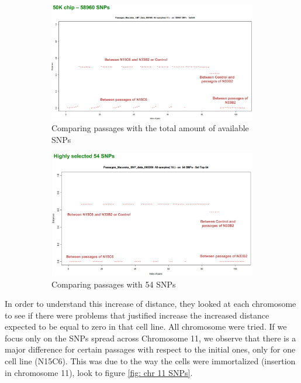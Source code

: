 \begin{figure}[ht]
	\centering
	\begin{subfigure}[t]{0.80\textwidth}
		\centering
		\includegraphics[width=1\textwidth]{50Kchip.PNG}
		\caption{Comparing passages with the total amount of available SNPs}
		\label{subfig: 50k SNPs}
	\end{subfigure}
	\hfill
	\begin{subfigure}[t]{0.80\textwidth}
		\centering
		\includegraphics[width=1\textwidth]{54SNPchip.PNG}
		\caption{Comparing passages with 54 SNPs}
		\label{subfig: 54 SNPs}
	\end{subfigure}
	\caption{}
	\label{fig: cell lines comparison}
\end{figure}


In order to understand this increase of distance, they looked at each chromosome
to see if there were problems that justified increase the increased distance
expected to be equal to zero in that cell line. All chromosome were tried. If we
focus only on the SNPs spread across Chromosome 11, we observe that there is a
major difference for certain passages with respect to the initial ones, only for
one cell line (N15C6). This was due to the way the cells were immortalized
(insertion in chromosome 11), look to figure \ref{fig: chr 11 SNPs}.

